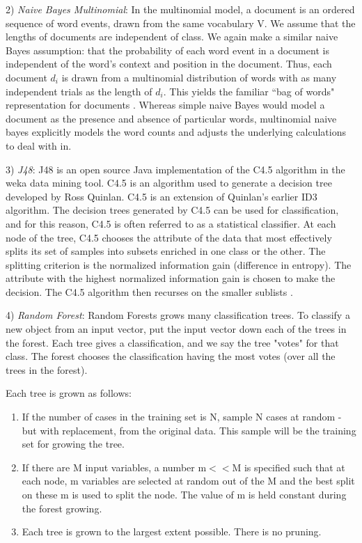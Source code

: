 \documentclass[conference]{IEEEtran}
\begin{document}
2) \textit{Naive Bayes Multinomial}: In the multinomial model, a document is an ordered sequence of word events, drawn from the same vocabulary V. We assume that the lengths of documents are independent of class. We again make a similar naive Bayes assumption: that the probability of each word event in a document is independent of the word’s context and position in the document. Thus, each document $d_i$ is drawn from a multinomial distribution of words with as many independent trials as the length of $d_i$. This yields the familiar ``bag of words" representation for documents \cite{Nigam}. Whereas simple naive Bayes would model a document as the presence and absence of particular words, multinomial naive bayes explicitly models the word counts and adjusts the underlying calculations to deal with in. 

3) \textit{J48}: J48 is an open source Java implementation of the C4.5 algorithm in the weka data mining tool. C4.5 is an algorithm used to generate a decision tree developed by Ross Quinlan. C4.5 is an extension of Quinlan's earlier ID3 algorithm. The decision trees generated by C4.5 can be used for classification, and for this reason, C4.5 is often referred to as a statistical classifier. At each node of the tree, C4.5 chooses the attribute of the data that most effectively splits its set of samples into subsets enriched in one class or the other. The splitting criterion is the normalized information gain (difference in entropy). The attribute with the highest normalized information gain is chosen to make the decision. The C4.5 algorithm then recurses on the smaller sublists \cite{j48}.

4) \textit{Random Forest}: Random Forests grows many classification trees. To classify a new object from an input vector, put the input vector down each of the trees in the forest. Each tree gives a classification, and we say the tree "votes" for that class. The forest chooses the classification having the most votes (over all the trees in the forest).

Each tree is grown as follows:

\begin{enumerate}
\item If the number of cases in the training set is N, sample N cases at random - but with replacement, from the original data. This sample will be the training set for growing the tree.
\item If there are M input variables, a number m$<<$M is specified such that at each node, m variables are selected at random out of the M and the best split on these m is used to split the node. The value of m is held constant during the forest growing.
\item Each tree is grown to the largest extent possible. There is no pruning.
\end{enumerate}
\end{document}
